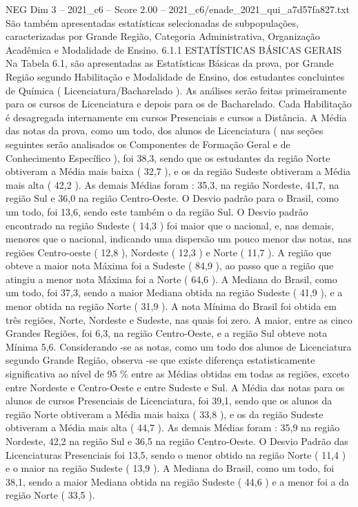 \begin{textsample}{NEG Dim 3 – 2021\_c6 – Score 2.00 – 2021\_c6/enade\_2021\_qui\_a7d57fa827.txt}
São também apresentadas estatísticas selecionadas de subpopulações, caracterizadas por Grande Região, Categoria Administrativa, Organização Acadêmica e Modalidade de Ensino. 6.1.1 ESTATÍSTICAS BÁSICAS GERAIS Na Tabela 6.1, são apresentadas as Estatísticas Básicas da prova, por Grande Região segundo Habilitação e Modalidade de Ensino, dos estudantes concluintes de Química ( Licenciatura/Bacharelado ).
As análises serão feitas primeiramente para os cursos de Licenciatura e depois para os de Bacharelado.
Cada Habilitação é desagregada internamente em cursos Presenciais e cursos a Distância.
A Média das notas da prova, como um todo, dos alunos de Licenciatura ( nas seções seguintes serão analisados os Componentes de Formação Geral e de Conhecimento Específico ), foi 38,3, sendo que os estudantes da região Norte obtiveram a Média mais baixa ( 32,7 ), e os da região Sudeste obtiveram a Média mais alta ( 42,2 ).
As demais Médias foram : 35,3, na região Nordeste, 41,7, na região Sul e 36,0 na região Centro-Oeste.
O Desvio padrão para o Brasil, como um todo, foi 13,6, sendo este também o da região Sul.
O Desvio padrão encontrado na região Sudeste ( 14,3 ) foi maior que o nacional, e, nas demais, menores que o nacional, indicando uma dispersão um pouco menor das notas, nas regiões Centro-oeste ( 12,8 ), Nordeste ( 12,3 ) e Norte ( 11,7 ).
A região que obteve a maior nota Máxima foi a Sudeste ( 84,9 ), ao passo que a região que atingiu a menor nota Máxima foi a Norte ( 64,6 ).
A Mediana do Brasil, como um todo, foi 37,3, sendo a maior Mediana obtida na região Sudeste ( 41,9 ), e a menor obtida na região Norte ( 31,9 ).
A nota Mínima do Brasil foi obtida em três regiões, Norte, Nordeste e Sudeste, nas quais foi zero.
A maior, entre as cinco Grandes Regiões, foi 6,3, na região Centro-Oeste, e a região Sul obteve nota Mínima 5,6.
Considerando -se as notas, como um todo dos alunos de Licenciatura segundo Grande Região, observa -se que existe diferença estatisticamente significativa ao nível de 95 \% entre as Médias obtidas em todas as regiões, exceto entre Nordeste e Centro-Oeste e entre Sudeste e Sul.
A Média das notas para os alunos de cursos Presenciais de Licenciatura, foi 39,1, sendo que os alunos da região Norte obtiveram a Média mais baixa ( 33,8 ), e os da região Sudeste obtiveram a Média mais alta ( 44,7 ).
As demais Médias foram : 35,9 na região Nordeste, 42,2 na região Sul e 36,5 na região Centro-Oeste.
O Desvio Padrão das Licenciaturas Presenciais foi 13,5, sendo o menor obtido na região Norte ( 11,4 ) e o maior na região Sudeste ( 13,9 ).
A Mediana do Brasil, como um todo, foi 38,1, sendo a maior Mediana obtida na região Sudeste ( 44,6 ) e a menor foi a da região Norte ( 33,5 ).

\end{textsample}
